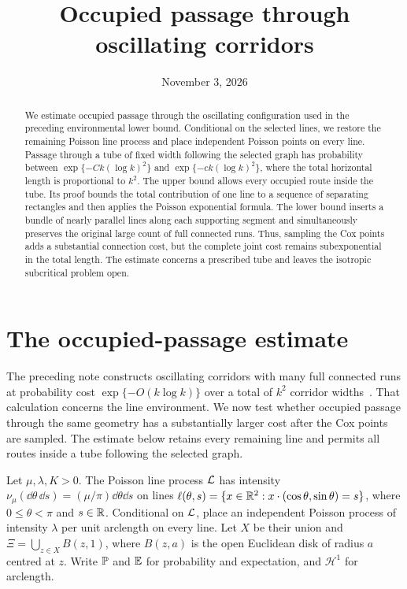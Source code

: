 \documentclass[11pt,letterpaper]{article}
\title{Occupied passage through oscillating corridors}
\author{}
\date{November 3, 2026}
\begin{document}
\maketitle
\begin{abstract}
We estimate occupied passage through the oscillating configuration used in the preceding environmental lower bound. Conditional on the selected lines, we restore the remaining Poisson line process and place independent Poisson points on every line. Passage through a tube of fixed width following the selected graph has probability between $\exp\{-Ck(\log k)^2\}$ and $\exp\{-ck(\log k)^2\}$, where the total horizontal length is proportional to $k^2$. The upper bound allows every occupied route inside the tube. Its proof bounds the total contribution of one line to a sequence of separating rectangles and then applies the Poisson exponential formula. The lower bound inserts a bundle of nearly parallel lines along each supporting segment and simultaneously preserves the original large count of full connected runs. Thus, sampling the Cox points adds a substantial connection cost, but the complete joint cost remains subexponential in the total length. The estimate concerns a prescribed tube and leaves the isotropic subcritical problem open.
\end{abstract}

\section{The occupied-passage estimate}

The preceding note constructs oscillating corridors with many full connected runs at probability cost $\exp\{-O(k\log k)\}$ over a total of $k^2$ corridor widths~\cite{OSC26}. That calculation concerns the line environment. We now test whether occupied passage through the same geometry has a substantially larger cost after the Cox points are sampled. The estimate below retains every remaining line and permits all routes inside a tube following the selected graph.

Let $\mu,\lambda,K>0$. The Poisson line process $\cL$ has intensity $\nu_\mu(\dd\theta\,\dd s)=(\mu/\pi)\dd\theta\dd s$ on lines $\ell(\theta,s)=\{x\in\R^2:x\cdot(\cos\theta,\sin\theta)=s\}$, where $0\le\theta<\pi$ and $s\in\R$. Conditional on $\cL$, place an independent Poisson process of intensity $\lambda$ per unit arclength on every line. Let $X$ be their union and $\Xi=\bigcup_{z\in X}B(z,1)$, where $B(z,a)$ is the open Euclidean disk of radius $a$ centred at $z$. Write $\P$ and $\E$ for probability and expectation, and $\mathcal H^1$ for arclength.
\end{document}
